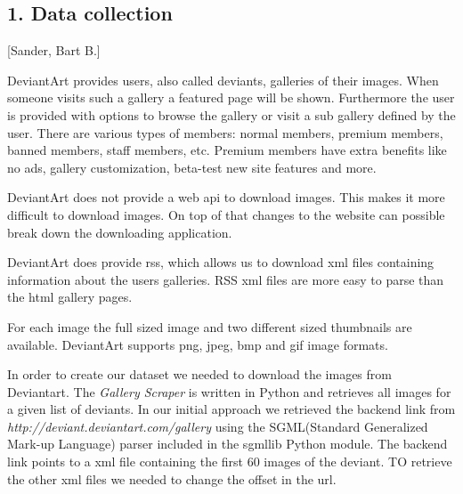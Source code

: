 \subsection{1. Data collection}
[Sander, Bart B.]

DeviantArt provides users, also called deviants, galleries of their images. 
When someone visits such a gallery a featured page will be shown. Furthermore
the user is provided with options to browse the gallery or visit a sub gallery
defined by the user. There are various types of members: normal members, premium 
members, banned members, staff members, etc. Premium members have extra benefits
like no ads, gallery customization, beta-test new site features and more.

DeviantArt does not provide a web api to download images. This makes it more 
difficult to download images. On top of that changes to the website can possible break
down the downloading application.

DeviantArt does provide rss, which allows us to download xml files containing 
information about the users galleries. RSS xml files are more easy to parse
than the html gallery pages.

For each image the full sized image and two different sized thumbnails are 
available. DeviantArt supports png, jpeg, bmp and gif image formats.

In order to create our dataset we needed to download the images from Deviantart. 
The \textit{Gallery Scraper} is written in Python and retrieves all images for a given 
list of deviants. In our initial approach we retrieved 
the backend link from \textit{http://deviant.deviantart.com/gallery} using the 
SGML(Standard Generalized Mark-up Language) parser included in the sgmllib Python module. The backend link points 
to a xml file containing the first 60 images of the deviant. TO retrieve the other 
xml files we needed to change the offset in the url. 

